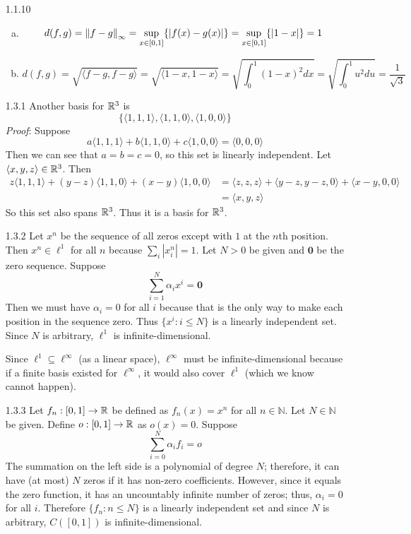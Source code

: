 \documentclass[../../Solutions.tex]{subfiles}
\begin{document}
\begin{itemize}
	\item [1.1.10]
	\begin{enumerate}[(a)]
		\item \begin{equation*}
			d(f,g) = \left\lVert f-g\right\rVert_\infty = \sup_{x\in [0,1]}\{|f(x)-g(x)|\} = \sup_{x\in [0,1]}\{|1-x|\} = 1
		\end{equation*}
		\item \begin{equation*}
			d(f,g) = \sqrt{\langle f-g , f-g \rangle} = \sqrt{\langle 1-x,1-x \rangle}
				 = \sqrt{\int_{0}^{1} (1-x)^2 dx} = \sqrt{\int_0^1 u^2 du} = \frac{1}{\sqrt{3}}
		\end{equation*}
	\end{enumerate}
	
	\item [1.3.1] Another basis for $\mathbb{R}^3$ is
	$$ \{ \langle 1,1,1 \rangle , \langle 1,1,0 \rangle , \langle 1,0,0 \rangle \} $$
	\textit{Proof}: Suppose
	$$ a\langle 1,1,1 \rangle + b\langle 1,1,0 \rangle + c\langle 1,0,0 \rangle = \langle 0,0,0 \rangle $$
	Then we can see that $a = b = c = 0$, so this set is linearly independent.
	Let $\langle x,y,z \rangle \in \mathbb{R}^3$.
	Then
	\begin{equation*} \begin{split}
		z\langle 1,1,1 \rangle + (y-z)\langle 1,1,0 \rangle + (x-y)\langle 1,0,0 \rangle &
			= \langle z,z,z \rangle + \langle y-z,y-z,0 \rangle + \langle x-y,0,0 \rangle \\
			& = \langle x,y,z \rangle
	\end{split} \end{equation*}
	So this set also spans $\mathbb{R}^3$.
	Thus it is a basis for $\mathbb{R}^3$.
	
	\item [1.3.2] Let $x^n$ be the sequence of all zeros except with $1$ at the $n$th position.
	Then $x^n \in \ell^1$ for all $n$ because $\sum_i |x^n_i| = 1$.
	Let $N > 0$ be given and $\mathbf{0}$ be the zero sequence.
	Suppose
	$$ \sum_{i = 1}^N \alpha_i x^i = \mathbf{0} $$
	Then we must have $\alpha_i = 0$ for all $i$ because that is the only way to make each position in the sequence zero.
	Thus $\{x^i : i \leq N \}$ is a linearly independent set.
	Since $N$ is arbitrary, $\ell^1$ is infinite-dimensional.
	
	Since $\ell^1 \subseteq \ell^\infty$ (as a linear space), $\ell^\infty$ must be infinite-dimensional because if a finite basis existed for $\ell^\infty$, it would also cover $\ell^1$ (which we know cannot happen).
	
	\item [1.3.3] Let $f_n:[0,1] \to \mathbb{R}$ be defined as $f_n(x) = x^n$ for all $n \in \mathbb{N}$.
	Let $N \in \mathbb{N}$ be given.
	Define $o:[0,1] \to \mathbb{R}$ as $o(x) = 0$.
	Suppose
	$$ \sum_{i=0}^N \alpha_i f_i = o $$
	The summation on the left side is a polynomial of degree $N$; therefore, it can have (at most) $N$ zeros if it has non-zero coefficients.
	However, since it equals the zero function, it has an uncountably infinite number of zeros; thus, $\alpha_i = 0$ for all $i$.
	Therefore $\{f_n : n \leq N \}$ is a linearly independent set and since $N$ is arbitrary, $C([0,1])$ is infinite-dimensional.
	
\end{itemize}
\end{document}
